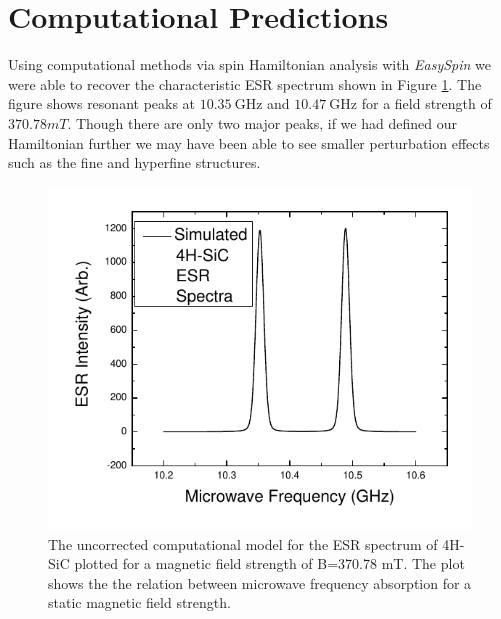 \documentclass[oneside, noacknowlegments]{BYUPhys}
\begin{document}
\section{Computational Predictions}

Using computational methods via spin Hamiltonian analysis with \textit{EasySpin} we were able to recover the characteristic ESR spectrum shown in Figure \ref{fig:SiCModel}. The figure shows resonant peaks at $10.35~\text{GHz}$ and $10.47~\text{GHz}$ for a field strength of $370.78 mT$. Though there are only two major peaks, if we had defined our Hamiltonian further we may have been able to see smaller perturbation effects such as the fine and hyperfine structures.

\begin{figure}
    \centerline{\includegraphics{p14-esr-uncorrected}}
    \caption[ESR Computational Model for SiC]{\label{fig:SiCModel}
     The uncorrected computational model for the ESR spectrum of 4H-SiC plotted for a magnetic field strength of B=370.78 mT. The plot shows the the relation between microwave frequency absorption for a static magnetic field strength.}
 \end{figure}
\end{document}
